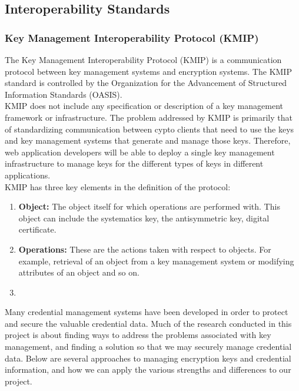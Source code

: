 \documentclass[11pt, a4paper, twoside, notitlepage]{article}
\begin{document}
\subsection*{Interoperability Standards}
\subsubsection*{Key Management Interoperability Protocol (KMIP)}
The Key Management Interoperability Protocol (KMIP) is a communication protocol between key management systems and encryption systems. The KMIP standard is controlled by the Organization for the Advancement of Structured Information Standards (OASIS). \\

KMIP does not include any specification or description of a key management framework or infrastructure. The problem addressed by KMIP is primarily that of standardizing communication between cypto clients that need to use the keys and key management systems that generate and manage those keys. Therefore, web application developers will be able to deploy a single key management infrastructure to manage keys for the different types of keys in different applications. \\

KMIP has three key elements in the definition of the protocol:
\begin{enumerate}
\item \textbf{Object:} The object itself for which operations are performed with. This object can include the systematics key, the antisymmetric key, digital certificate.
\item \textbf{Operations:} These are the actions taken with respect to objects. For example, retrieval of an object from a key management system or modifying attributes of an object and so on.
\item
\end{enumerate}






Many credential management systems have been developed in order to protect and secure the valuable credential data. Much of the research conducted in this project is about finding ways to address the problems associated with key management, and finding a solution so that we may securely manage credential data. Below are several approaches to managing encryption keys and credential information, and how we can apply the various strengths and differences to our project. \\
\end{document}
